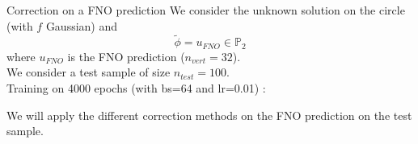 \documentclass[compress,10pt,xcolor={table,dvipsnames},t]{beamer}
\begin{document}
	\begin{frame}[allowframebreaks]{Correction on a FNO prediction}
		We consider the unknown solution on the circle (with $f$ Gaussian) and
		$$\tilde{\phi}=u_{FNO}\in\mathbb{P}_{2}$$
		where $u_{FNO}$ is the FNO prediction ($n_{vert}=32$). \\
		We consider a test sample of size $n_{test}=100$. \\
		Training on 4000 epochs (with bs=64 and lr=0.01) :
		\begin{minipage}{0.52\linewidth}
			\centering
		\end{minipage}
		\begin{minipage}{0.46\linewidth}
			\centering
		\end{minipage}	
		
		\newpage
		
		We will apply the different correction methods on the FNO prediction on the test sample. \\
		\begin{minipage}{0.58\linewidth}
			\centering
		\end{minipage} \;
		\begin{minipage}{0.38\linewidth}
			\centering
		\end{minipage}
	\end{frame}
\end{document}
